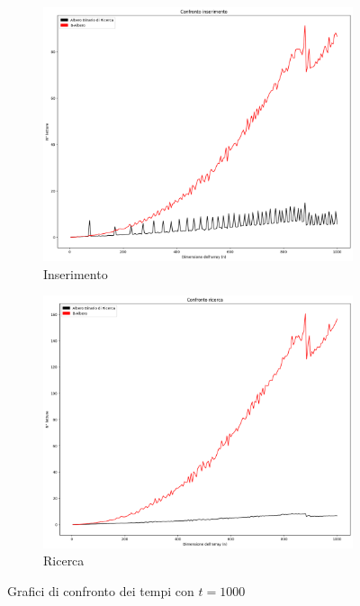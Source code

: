 \begin{figure}[H]
    \centering
    \begin{subfigure}[b]{0.49\textwidth}
        \centering
        \includegraphics[width=\textwidth]{comparison-graphs/insert-ms-t1000.png}
        \caption{Inserimento}
        \label{fig:compgraphinserttimet1000}
    \end{subfigure}
    \hfill
    \begin{subfigure}[b]{0.49\textwidth}
        \centering
        \includegraphics[width=\textwidth]{comparison-graphs/search-ms-t1000.png}
        \caption{Ricerca}
        \label{fig:compgraphsearchtimet1000}
    \end{subfigure}
    \caption{Grafici di confronto dei tempi con $t=1000$}
    \label{fig:compgraphtimest1000}
\end{figure}



